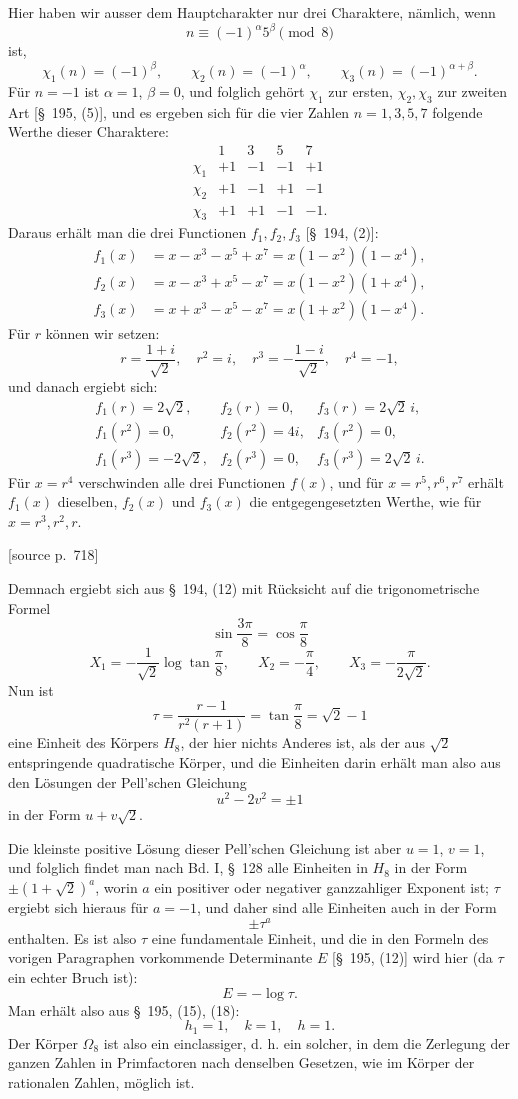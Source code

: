 \documentclass[11pt]{article}
\newcommand{\srcpage}[1]{\par\medskip\noindent\textsf{[source p.~#1]}\par\smallskip}
\begin{document}
Hier haben wir ausser dem Hauptcharakter nur drei Charaktere, nämlich, wenn
\[
n\equiv(-1)^\alpha5^\beta\pmod8
\]
ist,
\[
\chi_1(n)=(-1)^\beta,
\qquad
\chi_2(n)=(-1)^\alpha,
\qquad
\chi_3(n)=(-1)^{\alpha+\beta}.
\]
Für $n=-1$ ist $\alpha=1$, $\beta=0$, und folglich gehört $\chi_1$ zur ersten, $\chi_2,\chi_3$ zur zweiten Art [\S~195, (5)], und es ergeben sich für die vier Zahlen $n=1,3,5,7$ folgende Werthe dieser Charaktere:
\[
\begin{array}{c|rrrr}
&1&3&5&7\\\hline
\chi_1&+1&-1&-1&+1\\
\chi_2&+1&-1&+1&-1\\
\chi_3&+1&+1&-1&-1.
\end{array}
\]
Daraus erhält man die drei Functionen $f_1,f_2,f_3$ [\S~194, (2)]:
\[
\begin{aligned}
f_1(x)&=x-x^3-x^5+x^7=x(1-x^2)(1-x^4),\\
f_2(x)&=x-x^3+x^5-x^7=x(1-x^2)(1+x^4),\\
f_3(x)&=x+x^3-x^5-x^7=x(1+x^2)(1-x^4).
\end{aligned}
\]
Für $r$ können wir setzen:
\[
r=\frac{1+i}{\sqrt2},\quad r^2=i,
\quad r^3=-\frac{1-i}{\sqrt2},\quad r^4=-1,
\]
und danach ergiebt sich:
\[
\begin{array}{lll}
f_1(r)=2\sqrt2,& f_2(r)=0,& f_3(r)=2\sqrt2\,i,\\
f_1(r^2)=0,& f_2(r^2)=4i,& f_3(r^2)=0,\\
f_1(r^3)=-2\sqrt2,& f_2(r^3)=0,& f_3(r^3)=2\sqrt2\,i.
\end{array}
\]
Für $x=r^4$ verschwinden alle drei Functionen $f(x)$, und für $x=r^5,r^6,r^7$ erhält $f_1(x)$ dieselben, $f_2(x)$ und $f_3(x)$ die entgegengesetzten Werthe, wie für $x=r^3,r^2,r$.

\srcpage{718}
Demnach ergiebt sich aus \S~194, (12) mit Rücksicht auf die trigonometrische Formel
\[
\sin\frac{3\pi}{8}=\cos\frac\pi8
\]
\[
X_1=-\frac1{\sqrt2}\log\tan\frac\pi8,
\qquad
X_2=-\frac\pi4,
\qquad
X_3=-\frac\pi{2\sqrt2}.
\]
Nun ist
\[
\tau=\frac{r-1}{r^2(r+1)}=\tan\frac\pi8=\sqrt2-1
\]
eine Einheit des Körpers $H_8$, der hier nichts Anderes ist, als der aus $\sqrt2$ entspringende quadratische Körper, und die Einheiten darin erhält man also aus den Lösungen der Pell'schen Gleichung
\[
u^2-2v^2=\pm1
\]
in der Form $u+v\sqrt2$.

Die kleinste positive Lösung dieser Pell'schen Gleichung ist aber $u=1$, $v=1$, und folglich findet man nach Bd. I, \S~128 alle Einheiten in $H_8$ in der Form $\pm(1+\sqrt2)^a$, worin $a$ ein positiver oder negativer ganzzahliger Exponent ist; $\tau$ ergiebt sich hieraus für $a=-1$, und daher sind alle Einheiten auch in der Form
\[
\pm\tau^a
\]
enthalten. Es ist also $\tau$ eine fundamentale Einheit, und die in den Formeln des vorigen Paragraphen vorkommende Determinante $E$ [\S~195, (12)] wird hier (da $\tau$ ein echter Bruch ist):
\[
E=-\log\tau.
\]
Man erhält also aus \S~195, (15), (18):
\[
h_1=1,\quad k=1,\quad h=1.
\]
Der Körper $\Omega_8$ ist also ein einclassiger, d. h. ein solcher, in dem die Zerlegung der ganzen Zahlen in Primfactoren nach denselben Gesetzen, wie im Körper der rationalen Zahlen, möglich ist.
\end{document}
